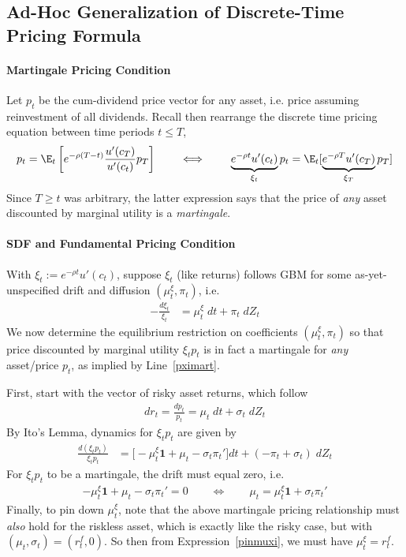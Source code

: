 \documentclass[12pt]{article}
\theoremstyle{plain}
\theoremstyle{definition}
\theoremstyle{remark}
\begin{document}
\clearpage
\subsection{Ad-Hoc Generalization of Discrete-Time Pricing Formula}
\label{subsec:adhoc}

\paragraph{Martingale Pricing Condition}
Let $p_t$ be the cum-dividend price vector for any asset, i.e.
price assuming reinvestment of all dividends.
Recall then rearrange the discrete time pricing equation between time
periods $t\leq T$,
\begin{align}
  p_t
  =
  \E_t\left[
    e^{-\rho(T-t)}
    \frac{u'(c_{T})}{u'(c_t)}
    p_{T}
  \right]
  \qquad\iff\qquad
  \underbrace{e^{-\rho t}u'(c_t) }_{\xi_t}
  p_t
  =
  \E_t[
    \underbrace{e^{-\rho T}u'(c_T) }_{\xi_T}
    p_{T}
  ]
  \label{pximart}
\end{align}
Since $T\geq t$ was arbitrary, the latter expression says that the price
of \emph{any} asset discounted by marginal utility is a
\emph{martingale}.

\paragraph{SDF and Fundamental Pricing Condition}
With $\xi_t:=e^{-\rho t}u'(c_t)$, suppose $\xi_t$ (like returns) follows
GBM for some as-yet-unspecified drift and diffusion
$(\mu_t^\xi,\pi_t)$, i.e.
\begin{align*}
  -\frac{d\xi_t}{\xi_t}
  &=
  \mu_t^\xi
  \;dt
  +
  \pi_t
  \;dZ_t
\end{align*}
We now determine the equilibrium restriction on coefficients
$(\mu_t^\xi,\pi_t)$ so that price discounted by marginal utility
$\xi_tp_t$ is in fact a martingale for \emph{any} asset/price $p_t$, as
implied by Line~\ref{pximart}.

First, start with the vector of risky asset returns, which follow
\begin{align*}
  dr_t
  =
  \frac{dp_t}{p_t}
  =
  \mu_t
  \;dt
  +
  \sigma_t
  \;dZ_t
\end{align*}
By Ito's Lemma, dynamics for $\xi_tp_t$ are given by
\begin{align*}
  \frac{d(\xi_tp_t)}{\xi_tp_t}
  &=
  \big[
    -\mu_t^\xi\mathbf{1}+\mu_t-\sigma_t\pi_t'
  \big]
  dt
  +
  (-\pi_t+\sigma_t)
  \;dZ_t
\end{align*}
For $\xi_tp_t$ to be a martingale, the drift must equal zero, i.e.
\begin{align}
  -\mu_t^\xi\mathbf{1}+\mu_t-\sigma_t\pi_t'
  = 0
  \qquad\iff\qquad
  \mu_t
  =
  \mu_t^\xi\mathbf{1}
  +\sigma_t\pi_t'
  \label{pinmuxi}
\end{align}
Finally, to pin down $\mu_t^\xi$, note that the above martingale pricing
relationship must \emph{also} hold for the riskless asset,
which is exactly like the risky case, but with
$(\mu_t,\sigma_t)=(r_t^f,0)$.
So then from Expression~\ref{pinmuxi}, we must have $\mu_t^\xi=r_t^f$.
\end{document}
